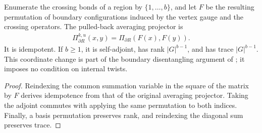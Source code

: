 \begin{lemma}%
    \label{thm:peps_regular_region_gauge_boundary}
    \leanok
    Enumerate the crossing bonds of a region by $\{1,\ldots,b\}$, and let
    $F$ be the resulting permutation of boundary configurations induced
    by the vertex gauge and the crossing operators. The pulled-back
    averaging projector is
    \begin{align}
        \Pi_{\partial R}^{k,u}(x,y)=\Pi_{\partial R}(F(x),F(y)).
    \end{align}
    It is idempotent. If $b\geq1$, it is self-adjoint, has rank
    $|G|^{b-1}$, and has trace $|G|^{b-1}$. This coordinate change is
    part of the boundary disentangling argument of
    \cite[Theorem~6.9]{Schuch2010PEPS}; it imposes no condition on
    internal twists.
\end{lemma}

\begin{proof}\leanok
    Reindexing the common summation variable in the square of the matrix
    by $F$ derives idempotence from that of the original averaging
    projector. Taking the adjoint commutes with applying the same
    permutation to both indices. Finally, a basis permutation preserves
    rank, and reindexing the diagonal sum preserves trace.
\end{proof}

